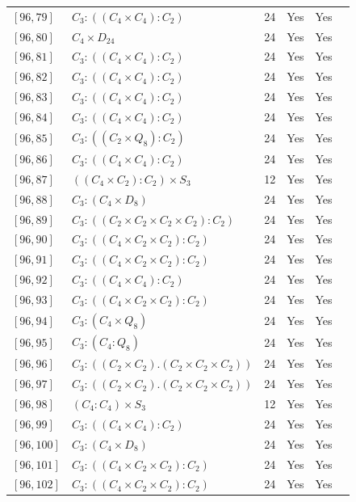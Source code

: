 \documentclass[12pt, a4paper]{article}
\theoremstyle{plain}
\theoremstyle{definition}
\begin{document}
\begin{longtable}{llcccl}
  $[96,79]$ & $C_3 : ((C_4 \times C_4) : C_2)$ & 24 & Yes & Yes \\
  $[96,80]$ & $C_4 \times D_{24}$ & 24 & Yes & Yes \\
  $[96,81]$ & $C_3 : ((C_4 \times C_4) : C_2)$ & 24 & Yes & Yes \\
  $[96,82]$ & $C_3 : ((C_4 \times C_4) : C_2)$ & 24 & Yes & Yes \\
  $[96,83]$ & $C_3 : ((C_4 \times C_4) : C_2)$ & 24 & Yes & Yes \\
  $[96,84]$ & $C_3 : ((C_4 \times C_4) : C_2)$ & 24 & Yes & Yes \\
  $[96,85]$ & $C_3 : ((C_2 \times Q_8) : C_2)$ & 24 & Yes & Yes \\
  $[96,86]$ & $C_3 : ((C_4 \times C_4) : C_2)$ & 24 & Yes & Yes \\
  $[96,87]$ & $((C_4 \times C_2) : C_2) \times S_3$ & 12 & Yes & Yes \\
  $[96,88]$ & $C_3 : (C_4 \times D_8)$ & 24 & Yes & Yes \\
  $[96,89]$ & $C_3 : ((C_2 \times C_2 \times C_2 \times C_2) : C_2)$ & 24 & Yes & Yes \\
  $[96,90]$ & $C_3 : ((C_4 \times C_2 \times C_2) : C_2)$ & 24 & Yes & Yes \\
  $[96,91]$ & $C_3 : ((C_4 \times C_2 \times C_2) : C_2)$ & 24 & Yes & Yes \\
  $[96,92]$ & $C_3 : ((C_4 \times C_4) : C_2)$ & 24 & Yes & Yes \\
  $[96,93]$ & $C_3 : ((C_4 \times C_2 \times C_2) : C_2)$ & 24 & Yes & Yes \\
  $[96,94]$ & $C_3 : (C_4 \times Q_8)$ & 24 & Yes & Yes \\
  $[96,95]$ & $C_3 : (C_4 : Q_8)$ & 24 & Yes & Yes \\
  $[96,96]$ & $C_3 : ((C_2 \times C_2) . (C_2 \times C_2 \times C_2))$ & 24 & Yes & Yes \\
  $[96,97]$ & $C_3 : ((C_2 \times C_2) . (C_2 \times C_2 \times C_2))$ & 24 & Yes & Yes \\
  $[96,98]$ & $(C_4 : C_4) \times S_3$ & 12 & Yes & Yes \\
  $[96,99]$ & $C_3 : ((C_4 \times C_4) : C_2)$ & 24 & Yes & Yes \\
  $[96,100]$ & $C_3 : (C_4 \times D_8)$ & 24 & Yes & Yes \\
  $[96,101]$ & $C_3 : ((C_4 \times C_2 \times C_2) : C_2)$ & 24 & Yes & Yes \\
  $[96,102]$ & $C_3 : ((C_4 \times C_2 \times C_2) : C_2)$ & 24 & Yes & Yes \\

\end{longtable}
\end{document}
